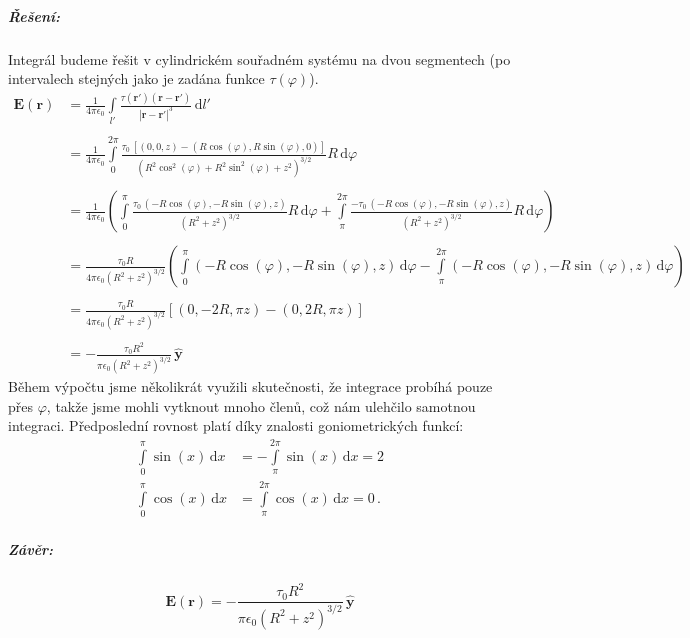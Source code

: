 \documentclass{article}
\let\oldhat\hat
\renewcommand{\hat}[1]{\oldhat{\mathbf{#1}}}
\newcommand{\vecvar}[1]{\boldsymbol{#1}}
\begin{document}
	\subparagraph{Řešení:}
		Integrál budeme řešit v cylindrickém souřadném systému na dvou segmentech (po intervalech stejných jako je zadána funkce $\tau(\varphi)$).
		\begin{align*}
			\vecvar{E(r)}
			&= \frac{1}{4 \pi \epsilon_0} \int\limits_{l'} \frac{\tau(\vecvar{r'}) (\vecvar{r - r'})}{|\vecvar{r - r'}|^3} \, \mathrm{d}l' \\ \\
			&= \frac{1}{4 \pi \epsilon_0} \int\limits_{0}^{2 \pi} \frac{\tau_0 \, [ (0,0,z) - (R \cos(\varphi), R \sin(\varphi),0) ]}{(R^2 \cos^2(\varphi) + R^2 \sin^2(\varphi) + z^2)^{3/2}} R \,
				\mathrm{d}\varphi \\ \\
			&= \frac{1}{4 \pi \epsilon_0} \left(
				\int\limits_{0}^{\pi} \frac{\tau_0 \, (-R \cos(\varphi), -R \sin(\varphi), z) }{(R^2 + z^2)^{3/2}} R \, \mathrm{d}\varphi
				+ \int\limits_{\pi}^{2 \pi} \frac{-\tau_0 \, (-R \cos(\varphi), -R \sin(\varphi), z)}{(R^2 + z^2)^{3/2}} R \, \mathrm{d}\varphi
				\right) \\ \\
			&= \frac{\tau_0 R}{4 \pi \epsilon_0 (R^2 + z^2)^{3/2}} \left(
				\int\limits_{0}^{\pi} (-R \cos(\varphi), -R \sin(\varphi), z) \, \mathrm{d}\varphi - \int\limits_{\pi}^{2 \pi} (-R \cos(\varphi), -R \sin(\varphi), z) \, \mathrm{d}\varphi
				\right) \\ \\
			&= \frac{\tau_0 R}{4 \pi \epsilon_0 (R^2 + z^2)^{3/2}} [ (0, -2R, \pi z) - (0, 2R, \pi z) ] \\ \\
			&= - \frac{\tau_0 R^2}{\pi \epsilon_0 (R^2 + z^2)^{3/2}} \, \hat{y}
		\end{align*}
		Během výpočtu jsme několikrát využili skutečnosti, že integrace probíhá pouze přes $\varphi$, takže jsme mohli vytknout mnoho členů, což nám ulehčilo samotnou integraci. Předposlední rovnost platí díky znalosti goniometrických funkcí:
		\begin{align*}
			\int\limits_{0}^{\pi} \sin(x) \, \mathrm{d}x &= -\int\limits_{\pi}^{2 \pi} \sin(x) \, \mathrm{d}x = 2 \\
			\int\limits_{0}^{\pi} \cos(x) \, \mathrm{d}x &= \int\limits_{\pi}^{2 \pi} \cos(x) \, \mathrm{d}x = 0 \, .
		\end{align*}
		
	\subparagraph{Závěr:}
		\begin{equation*}
			\vecvar{E(r)} = - \frac{\tau_0 R^2}{\pi \epsilon_0 (R^2 + z^2)^{3/2}} \, \hat{y}
		\end{equation*}
	
\end{document}

